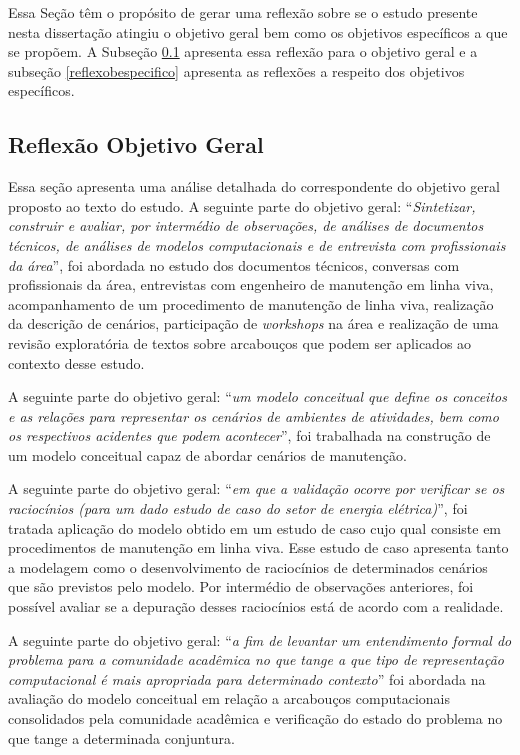 Essa Seção têm o propósito de gerar uma reflexão sobre se o estudo presente nesta dissertação atingiu o objetivo geral bem como os objetivos específicos a que se propõem. A Subseção \ref{reflexobgeral} apresenta essa reflexão para o objetivo geral e a subseção \ref{reflexobespecifico} apresenta as reflexões a respeito dos objetivos específicos.

\subsection{Reflexão Objetivo Geral}\label{reflexobgeral}

Essa seção apresenta uma análise detalhada do correspondente do objetivo geral proposto ao texto do estudo. A seguinte parte do objetivo geral: ``\textit{Sintetizar, construir e avaliar, por intermédio de observações, de análises de documentos técnicos, de análises de modelos computacionais e de entrevista com profissionais da área}'', foi abordada no estudo dos documentos técnicos, conversas com profissionais da área, entrevistas com engenheiro de manutenção em linha viva, acompanhamento de um procedimento de manutenção de linha viva, realização da descrição de cenários, participação de \textit{workshops} na área e realização de uma revisão exploratória de textos sobre arcabouços que podem ser aplicados ao contexto desse estudo. 

A seguinte parte do objetivo geral: ``\textit{um modelo conceitual que define os conceitos e as relações para representar os cenários de ambientes de atividades, bem como os respectivos acidentes que podem acontecer}'', foi trabalhada na construção de um modelo conceitual capaz de abordar cenários de manutenção. 

A seguinte parte do objetivo geral: ``\textit{em que a validação ocorre por verificar se os raciocínios (para um dado estudo de caso do setor de energia elétrica)}'', foi tratada aplicação do modelo obtido em um estudo de caso cujo qual consiste em procedimentos de manutenção em linha viva. Esse estudo de caso apresenta tanto a modelagem como o desenvolvimento de raciocínios de determinados cenários que são previstos pelo modelo. Por intermédio de observações anteriores, foi possível avaliar se a depuração desses raciocínios está de acordo com a realidade.  

A seguinte parte do objetivo geral: ``\textit{a fim de levantar um entendimento formal do problema para a comunidade acadêmica no que tange a que tipo de representação computacional é mais apropriada para determinado contexto}'' foi abordada na avaliação do modelo conceitual em relação a arcabouços computacionais consolidados pela comunidade acadêmica e verificação  do estado do problema no que tange a determinada conjuntura. 

